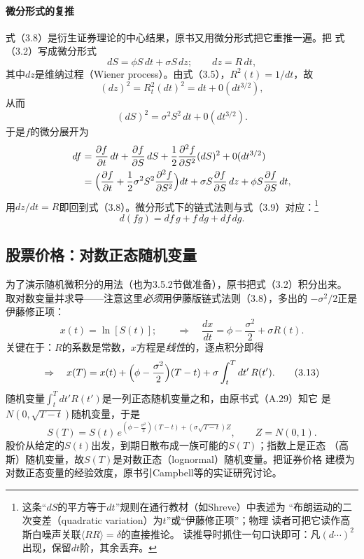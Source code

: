 \paragraph{微分形式的复推}
式（3.8）是衍生证券理论的中心结果，原书又用微分形式把它重推一遍。把
式（3.2）写成微分形式
\begin{equation*}
dS=\phi S\,dt+\sigma S\,dz;\qquad dz=R\,dt,
\tag{3.10}
\end{equation*}
其中$dz$是维纳过程（Wiener process）。由式（3.5），$R^{2}(t)=1/dt$，故
\begin{equation*}
(dz)^{2}=R_t^{2}(dt)^{2}=dt+0(dt^{3/2}),
\end{equation*}
从而
\begin{equation*}
(dS)^{2}=\sigma^{2}S^{2}\,dt+0(dt^{3/2}).
\end{equation*}
于是$f$的微分展开为
\begin{align*}
df&=\frac{\partial f}{\partial t}\,dt+\frac{\partial f}{\partial S}\,dS
+\frac{1}{2}\frac{\partial^{2}f}{\partial S^{2}}(dS)^{2}+0(dt^{3/2})\\
&=\Bigl(\frac{\partial f}{\partial t}
+\frac{1}{2}\sigma^{2}S^{2}\frac{\partial^{2}f}{\partial S^{2}}\Bigr)dt
+\sigma S\frac{\partial f}{\partial S}\,dz
+\phi S\frac{\partial f}{\partial S}\,dt,
\end{align*}
用$dz/dt=R$即回到式（3.8）。微分形式下的链式法则与式（3.9）对应：\footnote{这条“$dS$的平方等于$d t$”规则在通行教材（如Shreve）中表述为
“布朗运动的二次变差（quadratic variation）为$t$”或“伊藤修正项”；物理
读者可把它读作高斯白噪声关联$\langle R R\rangle=\delta$的直接推论。
读推导时抓住一句口诀即可：凡$(d\cdots)^{2}$出现，保留$d t$阶，其余丢弃。}
\begin{equation*}
d(fg)=df\,g+f\,dg+df\,dg.
\end{equation*}
\subsection*{股票价格：对数正态随机变量}

为了演示随机微积分的用法（也为3.5.2节做准备），原书把式（3.2）积分出来。
取对数变量并求导——注意这里\emph{必须}用伊藤版链式法则（3.8），多出的
$-\sigma^{2}/2$正是伊藤修正项：
\begin{equation*}
x(t)=\ln[S(t)];\qquad\Rightarrow\quad
\frac{dx}{dt}=\phi-\frac{\sigma^{2}}{2}+\sigma R(t).
\tag{3.12}
\end{equation*}
关键在于：$R$的系数是常数，$x$方程是\emph{线性}的，逐点积分即得
\begin{equation*}
\Rightarrow\quad
x(T)=x(t)+\Bigl(\phi-\frac{\sigma^{2}}{2}\Bigr)(T-t)
+\sigma\int_{t}^{T}dt'\,R(t').
\tag{3.13}
\end{equation*}
随机变量$\int_t^T dt' R(t')$是一列正态随机变量之和，由原书式（A.29）知它
是$N(0,\sqrt{T-t})$随机变量，于是
\begin{equation*}
S(T)=S(t)\,e^{(\phi-\frac{\sigma^{2}}{2})(T-t)+(\sigma\sqrt{T-t})Z},
\qquad Z=N(0,1).
\tag{3.14}
\end{equation*}
股价从给定的$S(t)$出发，到期日散布成一族可能的$S(T)$；指数上是正态
（高斯）随机变量，故$S(T)$是对数正态（lognormal）随机变量。把证券价格
建模为对数正态变量的经验效度，原书引Campbell等的实证研究讨论。

